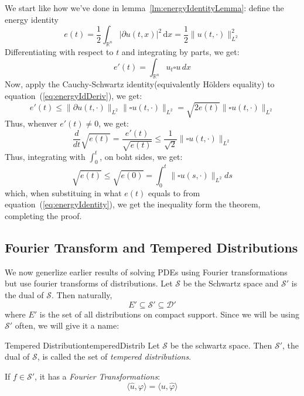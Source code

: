 \documentclass{book}
\newenvironment{Proof}[1][]
  {\begin{ProofTcb}[#1]}
  {\end{ProofTcb}}
\newcommand{\R}{{\mathbb{R}}}
\newcommand{\CD}{{\mathcal{D}}}
\newcommand{\CS}{{\mathcal{S}}}
\newcommand{\sse}{\subseteq}
\renewcommand{\phi}{\varphi}
\begin{document}
\begin{Proof}
	We start like how we've done in lemma~\ref{lm:energyIdentityLemma}: define the energy identity
	\begin{equation}\label{eq:energyIdentity}
	  e(t) = \frac{1}{2}\int_{\R^n} |  \partial u(t,x)|^2\,\textrm{d}x = \frac{1}{2} \|u(t, \cdot)\|_{L^2}^2
	\end{equation}
	Differentiating with respect to $t$ and integrating by parts, we get:
	\begin{equation}\label{eq:energyIdDeriv}
	  e'(t) =  \int_{\R^n} u_t \square u\, dx
	\end{equation}
	Now, apply the Cauchy-Schwartz identity(equivalently H\"olders equality) to equation~(\ref{eq:energyIdDeriv}), we get:
	\[
		e'(t) \le \|  \partial u(t, \cdot)\|_{L^2}\| \square u(t, \cdot)\|_{L^2} = \sqrt{2 e(t)} \| \square
		u(t,\cdot)\|_{L^2}
	\]
	Thus, whenver $e'(t) \ne 0$, we get:
	\[
		\frac{d}{dt}\sqrt{e(t)} = \frac{e'(t)}{\sqrt{e(t)}} \le \frac{1}{\sqrt{2}} \|\square u(t, \cdot)\|_{L^2}
	\]
	Thus, integrating with $\int_0^t$, on boht sides, we get:
	\[
		\sqrt{e(t)} \le \sqrt{e(0)} = \int_0^t \|\square u(s, \cdot)\|_{L^2}ds
	\]
	which, when substituing in what $e(t)$ equals to from equation~(\ref{eq:energyIdentity}), we get the inequality form
	the theorem, completing the proof.
\end{Proof}

\subsection{Fourier Transform and Tempered Distributions}

We now generlize earlier results of solving PDEs using Fourier transformations but use fourier transforms of
distributions. Let $\CS$ be the Schwartz space and $\CS'$ is the dual of $\CS$. Then naturally,
\[
	E' \sse \CS' \sse \CD'
\]
where $E'$ is the set of all distributions on compact support. Since we will be using $\CS'$ often, we will give it
a name:

\begin{defn}{Tempered Distribution}{temperedDistrib}
	Let $\CS$ be the schwartz space. Then $\CS'$, the dual of $\CS$, is called the set of \emph{tempered distributions}.
\end{defn}

If $f \in \CS'$, it has a \emph{Fourier Transformations}:
\[
	\langle \hat{u}, \phi\rangle = \langle u, \hat{\phi}\rangle
\]
\end{document}
